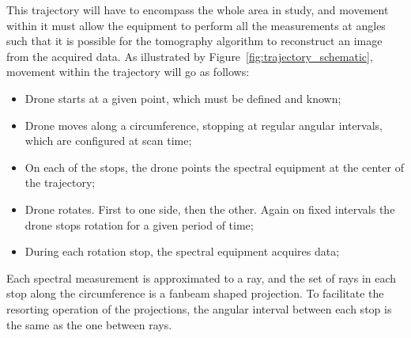 This trajectory will have to encompass the whole area in study, and
movement within it must allow the equipment to perform all the
measurements at angles such that it is possible for the tomography
algorithm to reconstruct an image from the acquired data. As illustrated
by Figure~\ref{fig:trajectory_schematic}, movement within the trajectory
will go as follows:
\begin{itemize}
    \item Drone starts at a given point, which must be defined and
        known;
    \item Drone moves along a circumference, stopping at regular angular
        intervals, which are configured at scan time;
    \item On each of the stops, the drone points the spectral equipment
        at the center of the trajectory;
    \item Drone rotates. First to one side, then the other. Again on
        fixed intervals the drone stops rotation for a given period of
        time;
    \item During each rotation stop, the spectral equipment acquires
        data;
\end{itemize}

Each spectral measurement is approximated to a ray, and the set of rays
in each stop along the circumference is a fanbeam shaped projection. To
facilitate the resorting operation of the projections, the angular
interval between each stop is the same as the one between rays.

